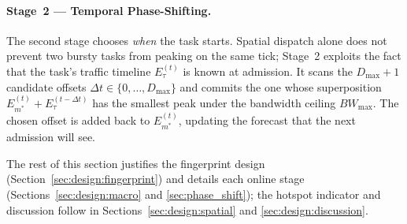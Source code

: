 \documentclass[letterpaper,twocolumn,10pt]{article}
\begin{document}
\paragraph{Stage~2 --- Temporal Phase-Shifting.} The second stage chooses \emph{when} the task starts. Spatial dispatch alone does not prevent two bursty tasks from peaking on the same tick; Stage~2 exploits the fact that the task's traffic timeline $E_\tau^{(t)}$ is known at admission. It scans the $D_{\max}\!+\!1$ candidate offsets $\Delta t\in\{0,\dots,D_{\max}\}$ and commits the one whose superposition $E_{m^{*}}^{(t)} + E_\tau^{(t-\Delta t)}$ has the smallest peak under the bandwidth ceiling $BW_{\max}$. The chosen offset is added back to $E_{m^{*}}^{(t)}$, updating the forecast that the next admission will see.

The rest of this section justifies the fingerprint design (Section~\ref{sec:design:fingerprint}) and details each online stage (Sections~\ref{sec:design:macro} and \ref{sec:phase_shift}); the hotspot indicator and discussion follow in Sections~\ref{sec:design:spatial} and \ref{sec:design:discussion}.
\end{document}
